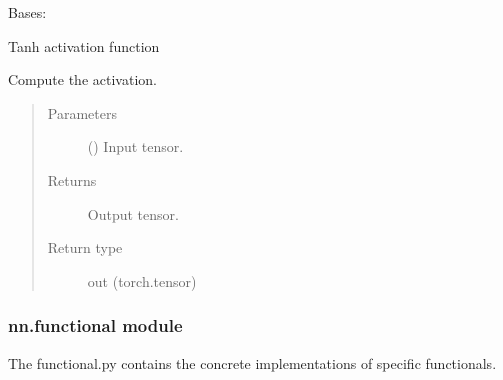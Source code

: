 \documentclass[letterpaper,10pt,english,openany,oneside]{sphinxmanual}
\begin{document}
\begin{fulllineitems}
\label{\detokenize{nn:nn.activation.Tanh}}
Bases: {\hyperref[\detokenize{nn:nn.activation.Activation}]{}}

Tanh activation function

\begin{fulllineitems}
\label{\detokenize{nn:nn.activation.Tanh.forward}}
Compute the activation.
\begin{quote}\begin{description}
\item[{Parameters}] \leavevmode
{} () \textendash{} Input tensor.

\item[{Returns}] \leavevmode
Output tensor.

\item[{Return type}] \leavevmode
out (torch.tensor)

\end{description}\end{quote}

\end{fulllineitems}


\end{fulllineitems}



\subsubsection{nn.functional module}
\label{\detokenize{nn:module-nn.functional}}\label{\detokenize{nn:nn-functional-module}}
The functional.py contains the concrete implementations of specific functionals.
\end{document}
